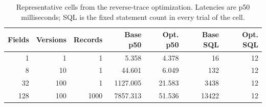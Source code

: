 \begin{table}[t]
\centering
\caption{Representative cells from the reverse-trace optimization. Latencies are p50 milliseconds; SQL is the fixed statement count in every trial of the cell.}
\label{tab:trace-optimization}
\footnotesize
\begin{tabular*}{\linewidth}{@{\extracolsep{\fill}}rrrrrrr@{}}
\toprule
Fields & Versions & Records & Base p50 & Opt. p50 & Base SQL & Opt. SQL \\
\midrule
1 & 1 & 1 & 5.358 & 4.378 & 16 & 12 \\
8 & 10 & 1 & 44.601 & 6.049 & 132 & 12 \\
32 & 100 & 1 & 1127.005 & 21.583 & 3438 & 12 \\
128 & 100 & 1000 & 7857.313 & 51.536 & 13422 & 12 \\
\bottomrule
\end{tabular*}
\end{table}
